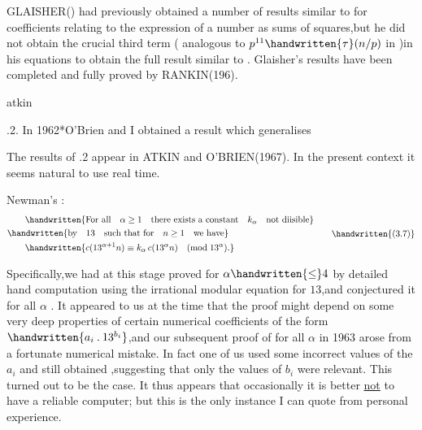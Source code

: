 GLAISHER() had previously obtained a number of results similar to  for coefficients relating to the expression of a number as sums of squares,but he did not obtain the crucial third term ( analogous to $p^{11}\handwritten{\tau}(n/p)$ in )in his equations to obtain the full result similar to . Glaisher's results have been completed and fully proved by RANKIN(196\hspace{1em}).

\noindent\hfill atkin  

\noindent{}.2. In 1962*O'Brien and I obtained a result which generalises

\noindent\handwritten{\rule{\linewidth}{0.4pt}}

\noindent *The results of \handwritten{\S}.2 appear in ATKIN and O'BRIEN(1967). In the present context it seems natural to use real time.

\noindent\handwritten{\rule{\linewidth}{0.4pt}}

\noindent Newman's :
\[
\begin{aligned}
&\qquad\handwritten{\text{For all}\quad\alpha\geq1\quad\text{there exists a constant}\quad k_{\alpha}\quad\text{not diisible}}\\
&\handwritten{\text{by}\quad13\quad\text{such that for}\quad n\geq1\quad\text{we have}}\\
&\qquad\handwritten{c(13^{\alpha+1}n)\equiv k_{\alpha}\,c(13^{\alpha}n)\quad(\mathrm{mod}\;13^{\alpha}).}
\end{aligned}
\tag*{\handwritten{(3.7)}}
\]

\noindent Specifically,we had at this stage proved  for $\alpha\handwritten{\leq}4$ by detailed hand computation using the irrational modular equation for $13$,and conjectured it for all $\alpha$ . It appeared to us at the time that the proof might depend on some very deep properties of certain numerical coefficients of the form $\handwritten{a_{i}\mathbin{.}13^{b_{i}}}$,and our subsequent proof of  for all $\alpha$ in 1963 arose from a fortunate numerical mistake. In fact one of us used \unsure{\textquotesingle}some incorrect values of the \uline{$a_{i}$} and still obtained ,suggesting that only the values of \uline{$b_{i}$} were relevant. This turned out to be the case. It thus appears that occasionally it is better \uline{not} to have a reliable computer; but this is the only instance I can quote from personal experience.


